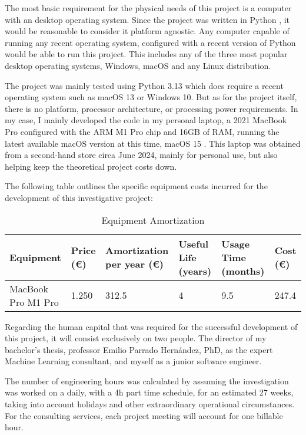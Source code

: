 \documentclass[12pt]{report} %
\begin{document}
The most basic requirement for the physical needs of this project is a computer with an desktop operating system. Since the project was written in Python \cite{python}, it would be reasonable to consider it platform agnostic. Any computer capable of running any recent operating system, configured with a recent version of Python would be able to run this project. This includes any of the three most popular desktop operating systems, Windows, macOS and any Linux distribution.

The project was mainly tested using Python 3.13 \cite{python3.13} which does require a recent operating system such as macOS 13 or Windows 10. But as for the project itself, there is no platform, processor architecture, or processing power requirements. In my case, I mainly developed the code in my personal laptop, a 2021 MacBook Pro configured with the ARM M1 Pro chip and 16GB of RAM, running the latest available macOS version at this time, macOS 15 \cite{macos}. This laptop was obtained from a second-hand store circa June 2024, mainly for personal use, but also helping keep the theoretical project costs down.

The following table outlines the specific equipment costs incurred for the development of this investigative project:
\begin{table}[H]
	\caption{Equipment Amortization}
	\centering
	\begin{tabular}{|P{2.8cm}|P{1.8cm}|P{2.5cm}|P{1.5cm}|P{2cm}|P{1.5cm}|}
		\hline
		\textbf{Equipment} & \textbf{Price (€)} & \textbf{Amortization per year (€)} & \textbf{Useful Life (years)} & \textbf{Usage Time (months)} & \textbf{Cost (€)} \\
		\hline
		MacBook Pro M1 Pro & 1.250 & 312.5 & 4 & 9.5 & 247.4 \\
		\hline
	\end{tabular}
\end{table}

Regarding the human capital that was required for the successful development of this project, it will consist exclusively on two people. The director of my bachelor's thesis, professor Emilio Parrado Hernández, PhD, as the expert Machine Learning consultant, and myself as a junior software engineer. 

The number of engineering hours was calculated by assuming the investigation was worked on a daily, with a 4h part time schedule, for an estimated 27 weeks, taking into account holidays and other extraordinary operational circumstances. For the consulting services, each project meeting will account for one billable hour.
\end{document}

